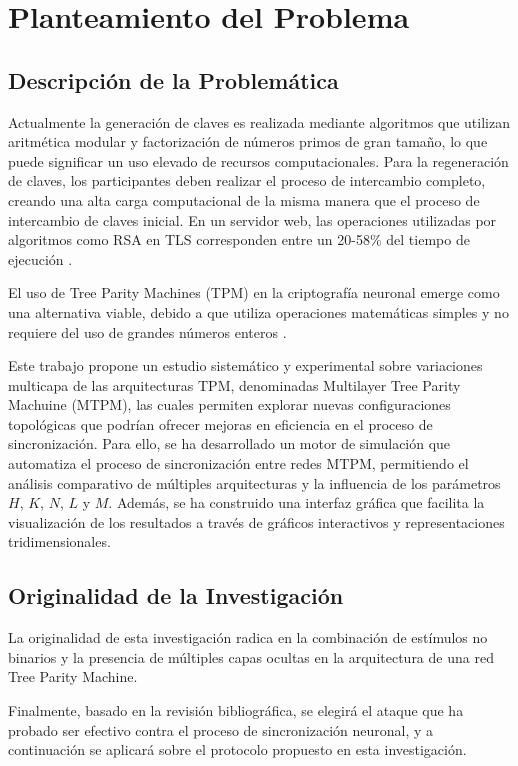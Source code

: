 \chapter{Planteamiento del Problema}
\section{Descripción de la Problemática}
Actualmente la generación de claves es realizada mediante algoritmos que utilizan aritmética modular y factorización de números primos de gran tamaño, lo que puede significar un uso elevado de recursos computacionales. Para la regeneración de claves, los participantes deben realizar el proceso de intercambio completo, creando una alta carga computacional de la misma manera que el proceso de intercambio de claves inicial. En un servidor web, las operaciones utilizadas por algoritmos como RSA en TLS corresponden entre un 20-58\% del tiempo de ejecución \cite{coarfa-2006}. 

El uso de Tree Parity Machines (TPM) en la criptografía neuronal emerge como una alternativa viable, debido a que utiliza operaciones 
matemáticas simples y no requiere del uso de grandes números enteros \cite{teodoroFPGABasedPerformanceEvaluation2021}.

Este trabajo propone un estudio sistemático y experimental sobre variaciones multicapa de las arquitecturas TPM, denominadas Multilayer Tree Parity Machuine (MTPM), las cuales permiten explorar nuevas configuraciones topológicas que podrían ofrecer mejoras en eficiencia en el proceso de sincronización. Para ello, se ha desarrollado un motor de simulación que automatiza el proceso de sincronización entre redes MTPM, permitiendo el análisis comparativo de múltiples arquitecturas y la influencia de los parámetros $H$, $K$, $N$, $L$ y $M$. Además, se ha construido una interfaz gráfica que facilita la visualización de los resultados a través de gráficos interactivos y representaciones tridimensionales.


\section{Originalidad de la Investigación}
La originalidad de esta investigación radica en la combinación de estímulos no binarios y la presencia de múltiples capas ocultas en la arquitectura de una red Tree Parity Machine. 

Finalmente, basado en la revisión bibliográfica, se elegirá el ataque que ha probado ser efectivo contra el proceso de sincronización neuronal, y a continuación se aplicará sobre el protocolo propuesto en esta investigación.

